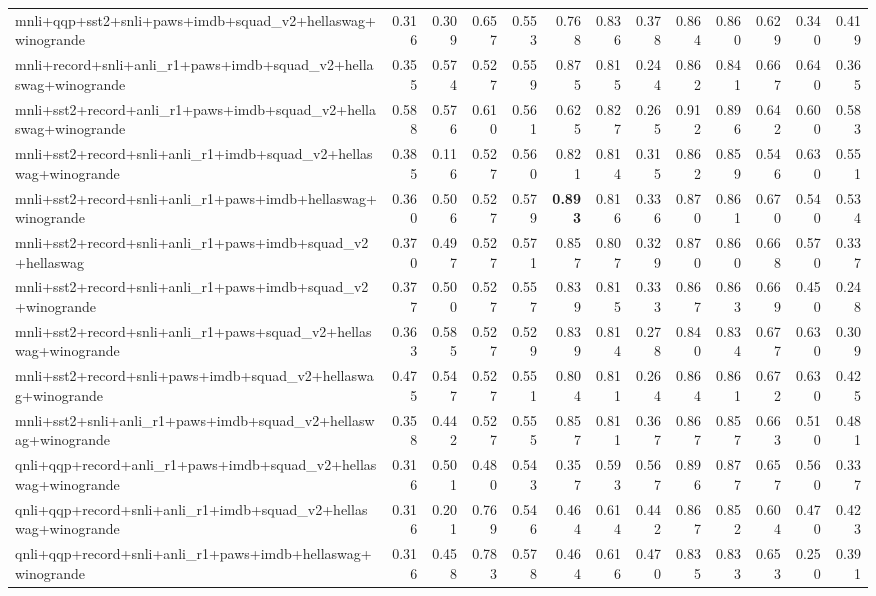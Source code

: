 \begin{table}[t]
\begin{tabular}{lrrrrrrrrrrrr}
    mnli+qqp+sst2+snli+paws+imdb+squad\_v2+hellaswag+winogrande & 0.316 & 0.309 & 0.657 & 0.553 & 0.768 & 0.836 & 0.378 & 0.864 & 0.860 & 0.629 & 0.340 & 0.419 \\
    mnli+record+snli+anli\_r1+paws+imdb+squad\_v2+hellaswag+winogrande & 0.355 & 0.574 & 0.527 & 0.559 & 0.875 & 0.815 & 0.244 & 0.862 & 0.841 & 0.667 & 0.640 & 0.365 \\
    mnli+sst2+record+anli\_r1+paws+imdb+squad\_v2+hellaswag+winogrande & 0.588 & 0.576 & 0.610 & 0.561 & 0.625 & 0.827 & 0.265 & 0.912 & 0.896 & 0.642 & 0.600 & 0.583 \\
    mnli+sst2+record+snli+anli\_r1+imdb+squad\_v2+hellaswag+winogrande & 0.385 & 0.116 & 0.527 & 0.560 & 0.821 & 0.814 & 0.315 & 0.862 & 0.859 & 0.546 & 0.630 & 0.551 \\
    mnli+sst2+record+snli+anli\_r1+paws+imdb+hellaswag+winogrande & 0.360 & 0.506 & 0.527 & 0.579 & \textbf{0.893} & 0.816 & 0.336 & 0.870 & 0.861 & 0.670 & 0.540 & 0.534 \\
    mnli+sst2+record+snli+anli\_r1+paws+imdb+squad\_v2+hellaswag & 0.370 & 0.497 & 0.527 & 0.571 & 0.857 & 0.807 & 0.329 & 0.870 & 0.860 & 0.668 & 0.570 & 0.337 \\
    mnli+sst2+record+snli+anli\_r1+paws+imdb+squad\_v2+winogrande & 0.377 & 0.500 & 0.527 & 0.557 & 0.839 & 0.815 & 0.333 & 0.867 & 0.863 & 0.669 & 0.450 & 0.248 \\
    mnli+sst2+record+snli+anli\_r1+paws+squad\_v2+hellaswag+winogrande & 0.363 & 0.585 & 0.527 & 0.529 & 0.839 & 0.814 & 0.278 & 0.840 & 0.834 & 0.677 & 0.630 & 0.309 \\
    mnli+sst2+record+snli+paws+imdb+squad\_v2+hellaswag+winogrande & 0.475 & 0.547 & 0.527 & 0.551 & 0.804 & 0.811 & 0.264 & 0.864 & 0.861 & 0.672 & 0.630 & 0.425 \\
    mnli+sst2+snli+anli\_r1+paws+imdb+squad\_v2+hellaswag+winogrande & 0.358 & 0.442 & 0.527 & 0.555 & 0.857 & 0.811 & 0.367 & 0.867 & 0.857 & 0.663 & 0.510 & 0.481 \\
    qnli+qqp+record+anli\_r1+paws+imdb+squad\_v2+hellaswag+winogrande & 0.316 & 0.501 & 0.480 & 0.543 & 0.357 & 0.593 & 0.567 & 0.896 & 0.877 & 0.657 & 0.560 & 0.337 \\
    qnli+qqp+record+snli+anli\_r1+imdb+squad\_v2+hellaswag+winogrande & 0.316 & 0.201 & 0.769 & 0.546 & 0.464 & 0.614 & 0.442 & 0.867 & 0.852 & 0.604 & 0.470 & 0.423 \\
    qnli+qqp+record+snli+anli\_r1+paws+imdb+hellaswag+winogrande & 0.316 & 0.458 & 0.783 & 0.578 & 0.464 & 0.616 & 0.470 & 0.835 & 0.833 & 0.653 & 0.250 & 0.391 \\

\end{tabular}
\end{table}
